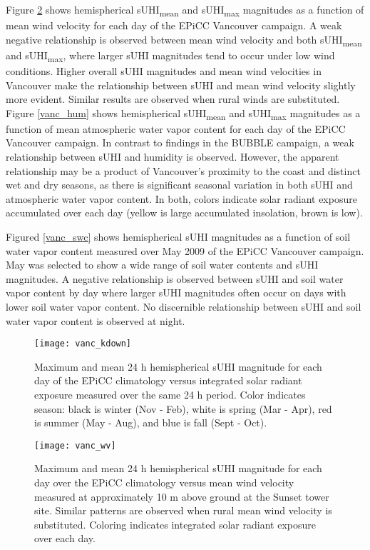 \begin{bibunit}
Figure \ref{vanc_wv} shows hemispherical sUHI\textsubscript{mean} and sUHI\textsubscript{max} magnitudes as a function of mean wind velocity for each day of the EPiCC Vancouver campaign. A weak negative relationship is observed between mean wind velocity and both sUHI\textsubscript{mean} and sUHI\textsubscript{max}, where larger sUHI magnitudes tend to occur under low wind conditions. Higher overall sUHI magnitudes and mean wind velocities in Vancouver make the relationship between sUHI and mean wind velocity slightly more evident. Similar results are observed when rural winds are substituted. Figure \ref{vanc_hum} shows hemispherical sUHI\textsubscript{mean} and sUHI\textsubscript{max} magnitudes as a function of mean atmospheric water vapor content for each day of the EPiCC Vancouver campaign. In contrast to findings in the BUBBLE campaign, a weak relationship between sUHI and humidity is observed. However, the apparent relationship may be a product of Vancouver’s proximity to the coast and distinct wet and dry seasons, as there is significant seasonal variation in both sUHI and atmospheric water vapor content. In both, colors indicate solar radiant exposure accumulated over each day (yellow is large accumulated insolation, brown is low).

Figured \ref{vanc_swc} shows hemispherical sUHI magnitudes as a function of soil water vapor content measured over May 2009 of the EPiCC Vancouver campaign. May was selected to show a wide range of soil water contents and sUHI magnitudes. A negative relationship is observed between sUHI and soil water vapor content by day where larger sUHI magnitudes often occur on days with lower soil water vapor content. No discernible relationship between sUHI and soil water vapor content is observed at night.

\begin{figure}[H]
	\centering
	\texttt{[image: vanc\_kdown]}
	\caption{Maximum and mean 24 \si{\hour} hemispherical sUHI magnitude for each day of the EPiCC climatology versus integrated solar radiant exposure measured over the same 24 \si{\hour} period. Color indicates season: black is winter (Nov - Feb), white is spring (Mar - Apr), red is summer (May - Aug), and blue is fall (Sept - Oct).}
	\label{vanc_sol}
\end{figure}

\begin{figure}[H]
	\centering
	\texttt{[image: vanc\_wv]}
	\caption{Maximum and mean 24 \si{\hour} hemispherical sUHI magnitude for each day over the EPiCC climatology versus mean wind velocity measured at approximately 10 \si{\meter} above ground at the Sunset tower site. Similar patterns are observed when rural mean wind velocity is substituted. Coloring indicates integrated solar radiant exposure over each day.}
	\label{vanc_wv}
\end{figure}


\end{bibunit}
